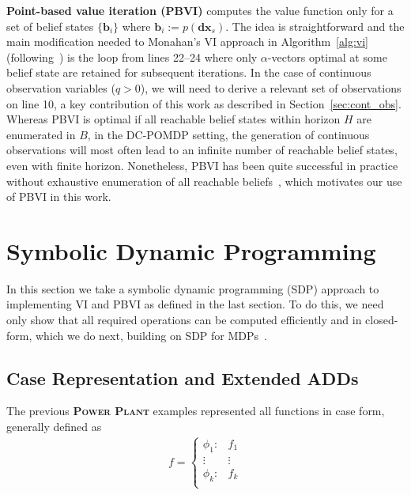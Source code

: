 \documentclass{article} %
\renewcommand{\vec}[1]{\mathbf{#1}} %
\newcommand{\xds}{\mathbf{dx}_s}
\begin{document}
\textbf{Point-based value iteration (PBVI)} computes the value
function only for a set of belief states $\{ \vec{b}_i \}$ where
$\vec{b}_i := p(\xds)$.  The idea is straightforward and the main
modification needed to Monahan's VI approach in Algorithm~\ref{alg:vi}
(following~\cite{Perseus_cont}) is the loop from lines 22--24 where
only $\alpha$-vectors optimal at some belief state are retained for
subsequent iterations.  In the case of continuous observation
variables ($q > 0$), we will need to derive a relevant set of
observations on line 10, a key contribution of this work as described
in Section~\ref{sec:cont_obs}.  Whereas PBVI is optimal if all
reachable belief states within horizon $H$ are enumerated in $B$, in the DC-POMDP
setting, the generation of continuous observations will most often
lead to an infinite number of reachable belief states, even with
finite horizon.  Nonetheless, PBVI has been quite successful in
practice without exhaustive enumeration of all reachable
beliefs~\cite{pbvi_jair06,hsvi2,Perseus,gapmin}, which motivates our
use of PBVI in this work.

\section{Symbolic Dynamic Programming} 

In this section we take a symbolic dynamic programming (SDP) approach
to implementing VI and PBVI as defined in the last section.  To do this,
we need only show that all required operations can be computed efficiently
and in closed-form, which we do next, building on SDP for 
MDPs~\cite{sanner_uai11}.  

\subsection{Case Representation and Extended ADDs}
\label{sec:case}

The previous \textsc{\bf Power Plant} examples represented all functions in case form,
generally defined as {\footnotesize
\vspace{-1mm}
\begin{align}
f = 
\begin{cases}
  \phi_1: & f_1 \\ 
 \vdots&\vdots\\ 
  \phi_k: & f_k \\ 
\end{cases} \nonumber
\end{align}
\vspace{-4mm}
}
\end{document}
